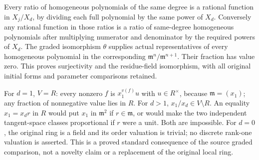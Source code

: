 Every ratio of homogeneous polynomials of the same degree is a rational function in \(X_j/X_d\), by dividing each full polynomial by the same power of \(X_d\). Conversely any rational function in those ratios is a ratio of same-degree homogeneous polynomials after multiplying numerator and denominator by the required powers of \(X_d\). The graded isomorphism \(\theta\) supplies actual representatives of every homogeneous polynomial in the corresponding \(\mathfrak m^n/\mathfrak m^{n+1}\). Their fraction has value zero. This proves surjectivity and the residue-field isomorphism, with all original initial forms and parameter comparisons retained.

For \(d=1\), \(V=R\): every nonzero \(f\) is \(x_1^{v(f)}u\) with \(u\in R^\times\), because \(\mathfrak m=(x_1)\); any fraction of nonnegative value lies in \(R\). For \(d>1\), \(x_1/x_d\in V\setminus R\). An equality \(x_1=x_dr\) in \(R\) would put \(x_1\) in \(\mathfrak m^2\) if \(r\in\mathfrak m\), or would make the two independent tangent-space classes proportional if \(r\) were a unit. Both are impossible. For \(d=0\), the original ring is a field and its order valuation is trivial; no discrete rank-one valuation is asserted. This is a proved standard consequence of the source graded comparison, not a novelty claim or a replacement of the original local ring.
